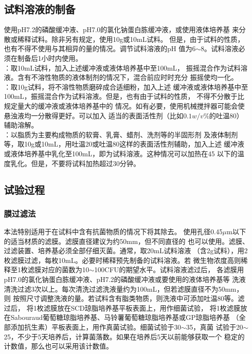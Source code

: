 \documentclass[11pt,a4paper]{article}
\newenvironment{SC}{%
  \CJKfamily{gbsn}%
  \CJKtilde
  \CJKnospace}{}
\begin{document}
\begin{CJK}{UTF8}{}
\begin{SC}
\subsection*{试料溶液的制备}
使用pH7.2的磷酸缓冲液、pH7.0的氯化钠蛋白胨缓冲液，或使用液体培养基
来分散或稀释试料。除非另有规定，使用10g或10mL试料。
但是，由于试料的性质，也有不得不使用与其相异的量的情况。调节试料溶液的pH
值为6$\sim$8\endnote{}。试料溶液必须在制备后1小时内使用。\\
：取10mL试料，加入上述缓冲液或液体培养基中至100mL，
振摇混合作为试料溶液。含有不溶性物质的液体制剂的情况下，混合前应时时充分
振摇使均一化。\\
：取10g试料，将不溶性物质磨碎成合适细粉，加入上述
缓冲液或液体培养基中至100mL，振摇混合作为试料溶液。但是，也有由于试料的性质，
不得不分散于比规定量大的缓冲液或液体培养基中的
情况。如有必要，使用机械搅拌器可能会使悬浊液均一分散得更好。可以加入
适当的表面活性剂（比如$0.1w/v\%$的吐温80）辅助溶解。\\
：以脂质为主要构成物质的软膏、乳膏、蜡剂、洗剂等的半固形剂
及液体制剂等，取10g或10mL，用吐温20或吐温80这样的表面活性剂辅助，加入上述
缓冲液或液体培养基中乳化至100mL，即为试料溶液。这种情况可以加热在45\textcelsius
以下的温度乳化。但是，不要将试料加热超过30分钟。\endnote{}


\subsection*{试验过程}
\renewcommand{\thesubsubsection}{（\arabic{subsubsection}）}
\subsubsection{膜过滤法} 
本法特别适用于在试料中含有抗菌物质的情况下将其除去。
使用孔径0.45$\mu$m以下的适当材质的滤膜\endnote{}。滤膜直径建议为约50mm，但不同直径的
也可以使用。滤膜、过滤装置、培养基必须全部仔细灭菌。通常，取20mL试料溶液
（含2g试料），用2枚滤膜过滤，每枚10mL。必要时稀释预先制备的试料溶液。若
微生物浓度高则稀释至1枚滤膜对应的菌数为10$\sim$100CFU的期望水平。试料溶液滤过后，
各滤膜用pH7.0的氯化钠蛋白胨缓冲液、pH7.2的磷酸缓冲液或要使用的液体培养基等
洗液清洗过滤3次以上。每次清洗过滤洗液量约为100mL，但若滤膜直径不为50mm，则
按照尺寸调整洗液的量。若试料含有脂类物质，则洗液中可添加吐温80等。滤过后，
将1枚滤膜放在SCD琼脂培养基平板\endnote{}表面上，用作细菌试验，
将1枚滤膜放在Sabouraud葡萄糖琼脂培养基、马铃薯葡萄糖琼脂培养基或GP琼脂培养基
（全部添加抗生素）\endnote{}平板表面上，用作真菌试验。细菌试验于30$\sim$35\textcelsius，真菌
试验于20$\sim$25\textcelsius，不少于5天培养后，计算菌落数。如果在培养后5天以前能够获取一个
稳定的计数值，那么也可以采用该计数值。


\end{SC}
\end{CJK}
\end{document}
